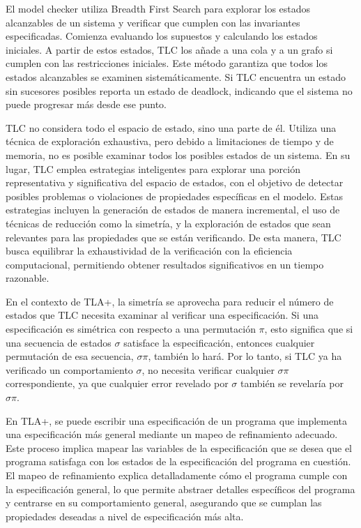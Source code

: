 \documentclass[runningheads]{llncs}
\begin{document}
El model checker utiliza Breadth First Search para explorar los estados alcanzables de un sistema y verificar que cumplen con las invariantes especificadas. Comienza evaluando los supuestos y calculando los estados iniciales. A partir de estos estados, TLC los añade a una cola y a un grafo si cumplen con las restricciones iniciales. Este método garantiza que todos los estados alcanzables se examinen sistemáticamente. Si TLC encuentra un estado sin sucesores posibles reporta un estado de deadlock, indicando que el sistema no puede progresar más desde ese punto.

TLC no considera todo el espacio de estado, sino una parte de él. Utiliza una técnica de exploración exhaustiva, pero debido a limitaciones de tiempo y de memoria, no es posible examinar todos los posibles estados de un sistema. En su lugar, TLC emplea estrategias inteligentes para explorar una porción representativa y significativa del espacio de estados, con el objetivo de detectar posibles problemas o violaciones de propiedades específicas en el modelo. Estas estrategias incluyen la generación de estados de manera incremental, el uso de técnicas de reducción como la simetría, y la exploración de estados que sean relevantes para las propiedades que se están verificando. De esta manera, TLC busca equilibrar la exhaustividad de la verificación con la eficiencia computacional, permitiendo obtener resultados significativos en un tiempo razonable.

En el contexto de TLA+, la simetría se aprovecha para reducir el número de estados que TLC necesita examinar al verificar una especificación. Si una especificación es simétrica con respecto a una permutación $\pi$, esto significa que si una secuencia de estados $\sigma$ satisface la especificación, entonces cualquier permutación de esa secuencia, $\sigma\pi$, también lo hará. Por lo tanto, si TLC ya ha verificado un comportamiento $\sigma$, no necesita verificar cualquier $\sigma\pi$ correspondiente, ya que cualquier error revelado por $\sigma$ también se revelaría por $\sigma\pi$.

En TLA+, se puede escribir una especificación de un programa que implementa una especificación más general mediante un mapeo de refinamiento adecuado. Este proceso implica mapear las variables de la especificación que se desea que el programa satisfaga con los estados de la especificación del programa en cuestión. El mapeo de refinamiento explica detalladamente cómo el programa cumple con la especificación general, lo que permite abstraer detalles específicos del programa y centrarse en su comportamiento general, asegurando que se cumplan las propiedades deseadas a nivel de especificación más alta.
\end{document}
